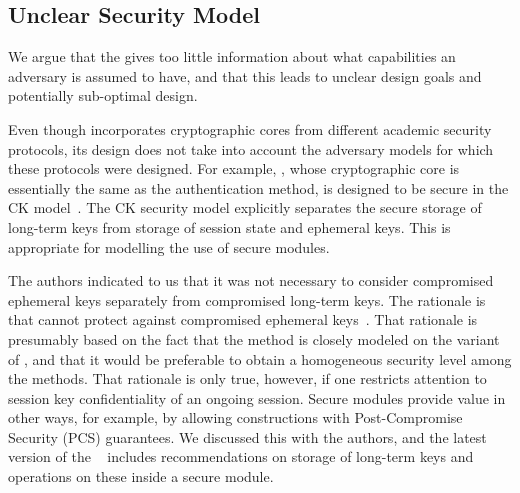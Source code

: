 \documentclass[a4paper,twoside,draft]{article}
\begin{document}
\subsection{Unclear Security Model}
%
We argue that the \mSpec{} gives too little information about what capabilities
an adversary is assumed to have, and that this leads to unclear design goals and
potentially sub-optimal design.
%
%

%
Even though \mEdhoc{} incorporates cryptographic cores from different academic
security protocols, its design does not take into account the adversary models
for which these protocols were designed.
%
For example, \mOptls{}, whose cryptographic core is essentially the same
as the \mStat{} authentication method, is designed to be secure in the CK
model~\cite{DBLP:conf/crypto/CanettiK02}.
%
The CK security model explicitly separates the secure storage of long-term
keys from storage of session state and ephemeral keys.
%
This is appropriate for modelling the use of secure modules.
%

The \mEdhoc{} authors indicated to us that it was
not necessary to consider compromised ephemeral keys separately from
compromised long-term keys.
%
The rationale is that \mSigma{} cannot protect against compromised ephemeral
keys~\cite{personalCommunication}.
%
That rationale is presumably based on the fact that the \mSigSig{} method is
closely modeled on the \mSigmaI{} variant of \mSigma{}, and that it would be
preferable to obtain a homogeneous security level among the \mEdhoc{}
methods.
%
That rationale is only true, however, if one restricts attention to session key
confidentiality of an ongoing session.
%
Secure modules provide value in other ways, for example, by allowing
constructions with Post-Compromise Security (PCS) guarantees.
%
We discussed this with the authors, and
the latest version of the \mSpec{}~\cite{latest-ietf-lake-edhoc-05} includes
recommendations on storage of long-term keys and operations on these inside a
secure module.
%
\end{document}
